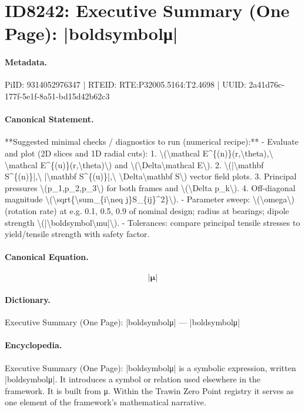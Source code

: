 \section*{ID8242: Executive Summary (One Page): |boldsymbolμ|}
\paragraph{Metadata.}
PiID: 9314052976347 | RTEID: RTE:P32005.5164:T2.4698 | UUID: 2a41d76c-177f-5e1f-8a51-bd15d42b62c3

\paragraph{Canonical Statement.}
**Suggested minimal checks / diagnostics to run (numerical recipe):** - Evaluate and plot (2D slices and 1D radial cuts): 1. \textbackslash{}(\textbackslash{}mathcal E\textasciicircum{}\{(n)\}(r,\textbackslash{}theta),\textbackslash{} \textbackslash{}mathcal E\textasciicircum{}\{(u)\}(r,\textbackslash{}theta)\textbackslash{}) and \textbackslash{}(\textbackslash{}Delta\textbackslash{}mathcal E\textbackslash{}). 2. \textbackslash{}(|\textbackslash{}mathbf S\textasciicircum{}\{(n)\}|,\textbackslash{} |\textbackslash{}mathbf S\textasciicircum{}\{(u)\}|,\textbackslash{} \textbackslash{}Delta\textbackslash{}mathbf S\textbackslash{}) vector field plots. 3. Principal pressures \textbackslash{}(p\_1,p\_2,p\_3\textbackslash{}) for both frames and \textbackslash{}(\textbackslash{}Delta p\_k\textbackslash{}). 4. Off-diagonal magnitude \textbackslash{}(\textbackslash{}sqrt\{\textbackslash{}sum\_\{i\textbackslash{}neq j\}S\_\{ij\}\textasciicircum{}2\}\textbackslash{}). - Parameter sweep: \textbackslash{}(\textbackslash{}omega\textbackslash{}) (rotation rate) at e.g. 0.1, 0.5, 0.9 of nominal design; radius at bearings; dipole strength \textbackslash{}(|\textbackslash{}boldsymbol\textbackslash{}mu|\textbackslash{}). - Tolerances: compare principal tensile stresses to yield/tensile strength with safety factor.

\paragraph{Canonical Equation.}
\[
|\boldsymbol\mu|
\]

\paragraph{Dictionary.}
Executive Summary (One Page): |boldsymbolμ| — |boldsymbolμ|

\paragraph{Encyclopedia.}
Executive Summary (One Page): |boldsymbolμ| is a symbolic expression, written |boldsymbolμ|. It introduces a symbol or relation used elsewhere in the framework. It is built from μ. Within the Trawin Zero Point registry it serves as one element of the framework's mathematical narrative.
